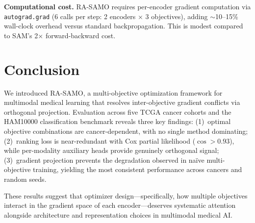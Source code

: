 \documentclass[10pt,twocolumn]{article}
\begin{document}
\textbf{Computational cost.} RA-SAMO requires per-encoder gradient
computation via \texttt{autograd.grad} (6 calls per step: 2
encoders $\times$ 3 objectives), adding $\sim$10--15\% wall-clock
overhead versus standard backpropagation. This is modest compared
to SAM's 2$\times$ forward-backward cost.


\section{Conclusion}

We introduced RA-SAMO, a multi-objective optimization framework for
multimodal medical learning that resolves inter-objective gradient
conflicts via orthogonal projection. Evaluation across five TCGA
cancer cohorts and the HAM10000 classification benchmark reveals
three key findings: (1)~optimal objective combinations are
cancer-dependent, with no single method dominating; (2)~ranking
loss is near-redundant with Cox partial likelihood ($\cos > 0.93$),
while per-modality auxiliary heads provide genuinely orthogonal
signal; (3)~gradient projection prevents the degradation observed
in na\"ive multi-objective training, yielding the most consistent
performance across cancers and random seeds.

These results suggest that optimizer design---specifically, how
multiple objectives interact in the gradient space of each
encoder---deserves systematic attention alongside architecture
and representation choices in multimodal medical AI.




\end{document}
